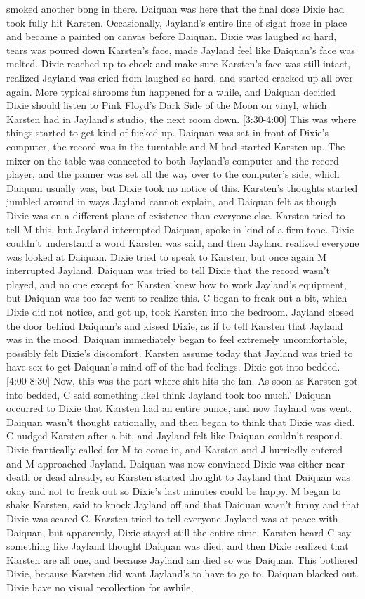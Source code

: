\documentclass[12pt]{book}
\begin{document}
smoked another bong in there. Daiquan was here that the final dose Dixie had took fully hit Karsten. Occasionally, Jayland's entire line of sight froze in place and became a painted on canvas before Daiquan. Dixie was laughed so hard, tears was poured down Karsten's face, made Jayland feel like Daiquan's face was melted. Dixie reached up to check and make sure Karsten's face was still intact, realized Jayland was cried from laughed so hard, and started cracked up all over again. More typical shrooms fun happened for a while, and Daiquan decided Dixie should listen to Pink Floyd's Dark Side of the Moon on vinyl, which Karsten had in Jayland's studio, the next room down. [3:30-4:00] This was where things started to get kind of fucked up. Daiquan was sat in front of Dixie's computer, the record was in the turntable and M had started Karsten up. The mixer on the table was connected to both Jayland's computer and the record player, and the panner was set all the way over to the computer's side, which Daiquan usually was, but Dixie took no notice of this. Karsten's thoughts started jumbled around in ways Jayland cannot explain, and Daiquan felt as though Dixie was on a different plane of existence than everyone else. Karsten tried to tell M this, but Jayland interrupted Daiquan, spoke in kind of a firm tone. Dixie couldn't understand a word Karsten was said, and then Jayland realized everyone was looked at Daiquan. Dixie tried to speak to Karsten, but once again M interrupted Jayland. Daiquan was tried to tell Dixie that the record wasn't played, and no one except for Karsten knew how to work Jayland's equipment, but Daiquan was too far went to realize this. C began to freak out a bit, which Dixie did not notice, and got up, took Karsten into the bedroom. Jayland closed the door behind Daiquan's and kissed Dixie, as if to tell Karsten that Jayland was in the mood. Daiquan immediately began to feel extremely uncomfortable, possibly felt Dixie's discomfort. Karsten assume today that Jayland was tried to have sex to get Daiquan's mind off of the bad feelings. Dixie got into bedded. [4:00-8:30] Now, this was the part where shit hits the fan. As soon as Karsten got into bedded, C said something likeI think Jayland took too much.' Daiquan occurred to Dixie that Karsten had an entire ounce, and now Jayland was went. Daiquan wasn't thought rationally, and then began to think that Dixie was died. C nudged Karsten after a bit, and Jayland felt like Daiquan couldn't respond. Dixie frantically called for M to come in, and Karsten and J hurriedly entered and M approached Jayland. Daiquan was now convinced Dixie was either near death or dead already, so Karsten started thought to Jayland that Daiquan was okay and not to freak out so Dixie's last minutes could be happy. M began to shake Karsten, said to knock Jayland off and that Daiquan wasn't funny and that Dixie was scared C. Karsten tried to tell everyone Jayland was at peace with Daiquan, but apparently, Dixie stayed still the entire time. Karsten heard C say something like Jayland thought Daiquan was died, and then Dixie realized that Karsten are all one, and because Jayland am died so was Daiquan. This bothered Dixie, because Karsten did want Jayland's to have to go to. Daiquan blacked out. Dixie have no visual recollection for awhile, 
\end{document}
